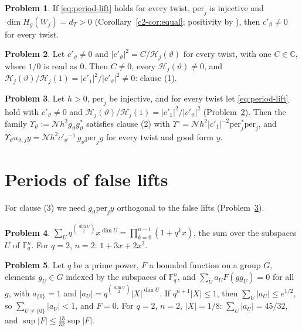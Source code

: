 \documentclass[reqno]{amsart}
\theoremstyle{definition}
\newtheorem{problem}{Problem}[section]
\theoremstyle{plain}
\theoremstyle{remark}
\newcommand{\C}{{\mathbb{C}}}
\newcommand{\F}{{\mathbb{F}}}
\newcommand{\Hc}{{\mathcal{H}}}
\newcommand{\Nc}{{\mathcal{N}}}
\newcommand{\per}{\mathrm{per}}
\newcommand{\vt}{\vartheta}
\begin{document}
\begin{problem}\label{pr:nonzero}
If \eqref{eq:period-lift} holds for every twist, \(\per_j\) is injective and \(\dim H_g(W_j) = d_T > 0\) (Corollary~\ref{c2-cor:equal}; positivity by \cite[SpanningTheorem, line 307]{GL}), then \(c'_\vt\ne0\) for every twist.
\end{problem}

\begin{problem}\label{pr:ratio}
Let \(c'_\vt\ne0\) and \(\lvert c'_\vt\rvert^2 = C/\Hc_j(\vt)\) for every twist, with one \(C\in\C\), where \(1/0\) is read as \(0\).  Then \(C\ne0\), every \(\Hc_j(\vt)\ne0\), and \(\Hc_j(\vt)/\Hc_j(1) = \lvert c'_1\rvert^2/\lvert c'_\vt\rvert^2 \ne 0\): clause (1).
\end{problem}

\begin{problem}\label{pr:clause2}
Let \(h>0\), \(\per_j\) be injective, and for every twist let \eqref{eq:period-lift} hold with \(c'_\vt\ne0\) and \(\Hc_j(\vt)/\Hc_j(1)=\lvert c'_1\rvert^2/\lvert c'_\vt\rvert^2\) (Problem~\ref{pr:ratio}).  Then the family \(\Upsilon_\vt := \Nc h^2 g_\vt g_\vt^*\) satisfies clause (2) with \(\Upsilon^\circ = \Nc h^2\lvert c'_1\rvert^{-2}\per_j^*\per_j\), and \(\Upsilon_\vt u_{\vt,j}y = \Nc h^2 c'_\vt{}^{-1}\, g_\vt\per_j y\) for every twist and good form \(y\).
\end{problem}

\section{Periods of false lifts}\label{sec:false}

For clause (3) we need \(g_\vt\per_jy\) orthogonal to the false lifts (Problem~\ref{pr:clause2}).

\begin{problem}\label{pr:qbinom}
\(\sum_U q^{\binom{\dim U}{2}}x^{\dim U} = \prod_{k=0}^{n-1}(1+q^kx)\), the sum over the subspaces \(U\) of \(\F_q^n\).  For \(q=2\), \(n=2\): \(1+3x+2x^2\).
\end{problem}

\begin{problem}\label{pr:small-roots}
Let \(q\) be a prime power, \(F\) a bounded function on a group \(G\), elements \(g_U\in G\) indexed by the subspaces of \(\F_q^n\), and \(\sum_U a_U F(gg_U) = 0\) for all \(g\), with \(a_{\{0\}} = 1\) and \(\lvert a_U\rvert = q^{\binom{\dim U}2}\lvert X\rvert^{\dim U}\).  If \(q^{n+1}\lvert X\rvert\le1\), then \(\sum_U\lvert a_U\rvert\le e^{1/2}\), so \(\sum_{U\ne\{0\}}\lvert a_U\rvert<1\), and \(F = 0\).
\label{pr:hecke-toy}
For \(q = 2\), \(n = 2\), \(\lvert X\rvert = 1/8\): \(\sum_U\lvert a_U\rvert=45/32\), and \(\sup\lvert F\rvert\le\frac{13}{32}\sup\lvert F\rvert\).
\end{problem}
\end{document}
